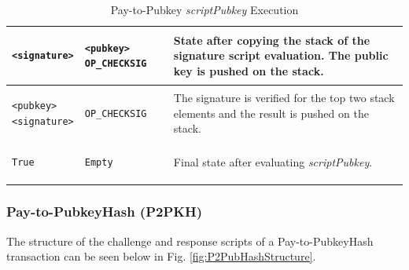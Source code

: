 \begin{table}
\begin{minipage}{\textwidth}
\begin{tabular}{| m{95pt} | m{145pt} | m{100pt} |}
\vspace{8pt}
\begin{BVerbatim}[fontsize==\relsize{-4}]
<signature>
\end{BVerbatim}
\vspace{4pt}
&
\vspace{8pt}
\begin{BVerbatim}[fontsize==\relsize{-4}]
<pubkey> OP_CHECKSIG
\end{BVerbatim} 
\vspace{4pt}
&
State after copying the stack of the signature script evaluation. The public key is pushed on the stack.\\ \hline	

\vspace{8pt}
\begin{BVerbatim}[fontsize==\relsize{-4}]
<pubkey>
<signature>
\end{BVerbatim}
\vspace{4pt}
&
\vspace{8pt}
\begin{BVerbatim}[fontsize==\relsize{-4}]
OP_CHECKSIG
\end{BVerbatim} 
\vspace{4pt}
&
The signature is verified for the top two stack elements and the result is pushed on the stack.\\ \hline	


\vspace{8pt}
\begin{BVerbatim}[fontsize==\relsize{-4}]
True
\end{BVerbatim}
\vspace{4pt}
&
\vspace{8pt}
\begin{BVerbatim}[fontsize==\relsize{-4}]
Empty
\end{BVerbatim} 
\vspace{4pt}
&
Final state after evaluating \textit{scriptPubkey}. \\ \hline

\end{tabular}
\vspace{5pt}
\caption{Pay-to-Pubkey \textit{scriptPubkey} Execution}
\label{tab:P2Pub2}

\end{minipage}
\end{table}

\clearpage
\subsubsection{Pay-to-PubkeyHash (P2PKH)} \label{sec:P2PKH}
The structure of the challenge and response scripts of a Pay-to-PubkeyHash transaction can be seen below in Fig. \ref{fig:P2PubHashStructure}.

